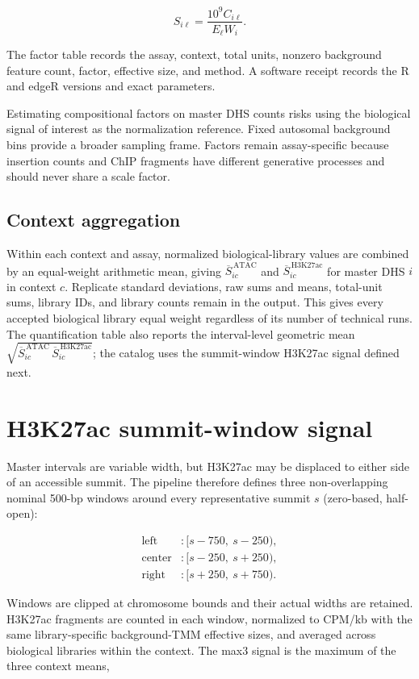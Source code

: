 \documentclass[11pt]{article}
\begin{document}
\[
  S_{i\ell}=\frac{10^9 C_{i\ell}}{E_{\ell}W_i}.
\]

The factor table records the assay, context, total units, nonzero background
feature count, factor, effective size, and method.  A software receipt records
the R and edgeR versions and exact parameters.

Estimating compositional factors on master DHS counts risks using the
biological signal of interest as the normalization reference.  Fixed
autosomal background bins provide a broader sampling frame.  Factors remain
assay-specific because insertion counts and ChIP fragments have different
generative processes and should never share a scale factor.

\subsection{Context aggregation}

Within each context and assay, normalized biological-library values are
combined by an equal-weight arithmetic mean, giving
\(\overline{S}^{\,\mathrm{ATAC}}_{ic}\) and
\(\overline{S}^{\,\mathrm{H3K27ac}}_{ic}\) for master DHS \(i\) in context
\(c\).  Replicate standard deviations, raw sums and means, total-unit sums,
library IDs, and library counts remain in the output.  This gives every
accepted biological library equal weight regardless of its number of
technical runs.  The quantification table also reports the interval-level
geometric mean
\(\sqrt{\overline{S}^{\,\mathrm{ATAC}}_{ic}\,\overline{S}^{\,\mathrm{H3K27ac}}_{ic}}\);
the catalog uses the summit-window H3K27ac signal defined next.

\section{H3K27ac summit-window signal}

Master intervals are variable width, but H3K27ac may be displaced to either
side of an accessible summit.  The pipeline therefore defines three
non-overlapping nominal 500-bp windows around every representative summit
\(s\) (zero-based, half-open):

\begin{align*}
  \text{left}   &: [s-750,\ s-250),\\
  \text{center} &: [s-250,\ s+250),\\
  \text{right}  &: [s+250,\ s+750).
\end{align*}

Windows are clipped at chromosome bounds and their actual widths are retained.
H3K27ac fragments are counted in each window, normalized to CPM/kb with the
same library-specific background-TMM effective sizes, and averaged across
biological libraries within the context.  The max3 signal is the maximum of the
three context means,
\end{document}
